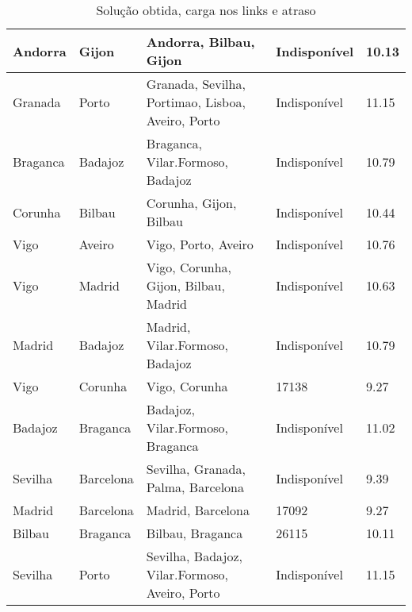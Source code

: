\begin{table}[!htb]
{\begin{tabular}{|l|l|l|l|l|}
Andorra & Gijon & Andorra, Bilbau, Gijon & Indisponível & 10.13 \\ \hline
Granada & Porto & Granada, Sevilha, Portimao, Lisboa, Aveiro, Porto & Indisponível & 11.15 \\ \hline
Braganca & Badajoz & Braganca, Vilar.Formoso, Badajoz & Indisponível & 10.79 \\ \hline
Corunha & Bilbau & Corunha, Gijon, Bilbau & Indisponível & 10.44 \\ \hline
Vigo & Aveiro & Vigo, Porto, Aveiro & Indisponível & 10.76 \\ \hline
Vigo & Madrid & Vigo, Corunha, Gijon, Bilbau, Madrid & Indisponível & 10.63 \\ \hline
Madrid & Badajoz & Madrid, Vilar.Formoso, Badajoz & Indisponível & 10.79 \\ \hline
Vigo & Corunha & Vigo, Corunha & 17138 & 9.27 \\ \hline
Badajoz & Braganca & Badajoz, Vilar.Formoso, Braganca & Indisponível & 11.02 \\ \hline
Sevilha & Barcelona & Sevilha, Granada, Palma, Barcelona & Indisponível & 9.39 \\ \hline
Madrid & Barcelona & Madrid, Barcelona & 17092 & 9.27 \\ \hline
Bilbau & Braganca & Bilbau, Braganca & 26115 & 10.11 \\ \hline
Sevilha & Porto & Sevilha, Badajoz, Vilar.Formoso, Aveiro, Porto & Indisponível & 11.15 \\ \hline
\end{tabular}}
\caption[]{Solução obtida, carga nos links e atraso}
\end{table}

